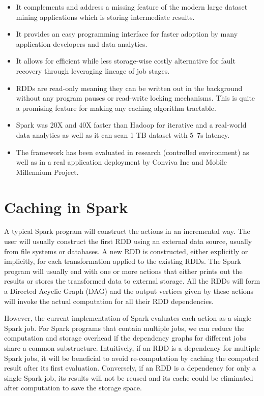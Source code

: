 \documentclass[11pt]{article}
\begin{document}
\begin{itemize}
\item It complements and address a missing feature of the modern large dataset mining applications which is storing intermediate results.
\item It provides an easy programming interface for faster adoption by many application developers and data analytics.
\item It allows for efficient while less storage-wise costly alternative for fault recovery through leveraging lineage of job stages.
\item RDDs are read-only meaning they can be written out in the background without any program pauses or read-write locking mechanisms. This is quite a promising feature for making any caching algorithm tractable.
\item Spark was 20X and 40X faster than Hadoop for iterative and a real-world data analytics as well as it can scan 1 TB dataset with 5–7s latency.
\item The framework has been evaluated in research (controlled environment) as well as in a real application deployment by Conviva Inc and Mobile Millennium Project.
\end{itemize}
	
\section{Caching in Spark}

A typical Spark program will construct the actions in an incremental way. The user will usually construct the first RDD using an external data source, usually from file systems or databases. A new RDD is constructed, either explicitly or implicitly, for each transformation applied to the existing RDDs. The Spark program will usually end with one or more actions that either prints out the results or stores the transformed data to external storage. All the RDDs will form a Directed Acyclic Graph (DAG) and the output vertices given by these actions will invoke the actual computation for all their RDD dependencies.

However, the current implementation of Spark evaluates each action as a single Spark job. For Spark programs that contain multiple jobs, we can reduce the computation and storage overhead if the dependency graphs for different jobs share a common substructure. Intuitively, if an RDD is a dependency for multiple Spark jobs, it will be beneficial to avoid re-computation by caching the computed result after its first evaluation. Conversely, if an RDD is a dependency for only a single Spark job, its results will not be reused and its cache could be eliminated after computation to save the storage space.
\end{document}
